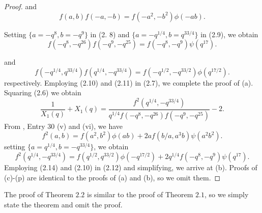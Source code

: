 \documentclass[11pt,a4paper]{article}
\numberwithin{equation}{section}
\theoremstyle{plain}
\begin{document}
\begin{proof}
		and
		\begin{equation}
			f(a,b)f(-a,-b)=f(-a^2,-b^2)\phi(-ab).
			\tag{2.9}
		\end{equation}
		
		Setting $\{a=-q^{8},b=-q^{9}\}$ in (2.
		8) and $\{a=-q^{1/4},b=q^{33/4}\}$ in (2.9), we obtain
		\begin{equation}
			f(-q^{8},-q^{26})f(-q^{9},-q^{25})
			=
			f(-q^{8},-q^{9})\psi(q^{17}).
			\tag{2.10}
		\end{equation}
		
		and 
		\begin{equation}
			f(-q^{1/4},q^{33/4})f(q^{1/4},-q^{33/4})=f(-q^{1/2},-q^{33/2})\phi(q^{17/2}).
			\tag{2.11}
		\end{equation}
		respectively. Employing (2.10) and (2.11) in (2.7), we complete the proof of (a).
		Squaring (2.6) we obtain
		\begin{equation}
			\frac{1}{X_1(q)}+X_1(q)
			=
			\frac{f^2(q^{1/4},-q^{33/4})}
			{q^{1/4}f(-q^{8},-q^{26})f(-q^{9},-q^{25})}-2.
			\tag{2.12}
		\end{equation}
		From \cite[p.~46]{Berndt}, Entry 30 (v) and (vi), we have
		\begin{equation}
			f^2(a,b)=f(a^2,b^2)\phi(ab)+2af(b/a,a^3b)\psi(a^2b^2).
			\tag{2.13}
		\end{equation}
		setting $\{a=q^{1/4},b=-q^{33/4}\}$, we obtain
		\begin{equation}
			f^2(q^{1/4},-q^{33/4})=f(q^{1/2},q^{33/2})\phi(-q^{17/2})+2q^{1/4}f(-q^{8},-q^{9})\psi(q^{17}).
			\tag{2.14}
		\end{equation}
		Employing (2.14) and (2.10) in (2.12) and simplifying, we arrive at (b).
		Proofs of (c)-(p) are identical to the proofs of (a) and (b), so we omit them.
	\end{proof} 
	The proof of Theorem $2.2$ is similar to the proof of Theorem $2.1$, so we simply state the theorem and omit the proof.
	
\end{document}
